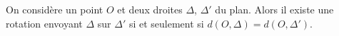 On considère un point $O$ et deux droites $\Delta$, $\Delta'$ du plan. Alors il existe une rotation envoyant $\Delta$ sur $\Delta'$ si et seulement si $d(O,\Delta) = d(O,\Delta')$.

\begin{reponses}
\end{reponses}

